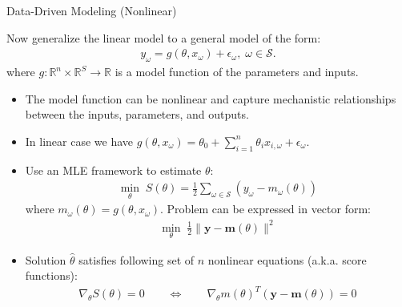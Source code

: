 \documentclass[9pt]{beamer}
\begin{document}
%
\begin{frame}{Data-Driven Modeling (Nonlinear)}

Now generalize the linear model to a general model of the form:
\begin{align*}
y_\omega=g(\theta, x_{\omega}) + \epsilon_\omega,\; \omega \in \mathcal{S}.
\end{align*}
where $g:\mathbb{R}^{n}\times \mathbb{R}^S\to \mathbb{R}$ is a model function of the parameters and inputs. 

\begin{itemize}
\item The model function can be nonlinear and capture mechanistic relationships between the inputs, parameters, and outputs. 

\item In linear case we have $g(\theta,x_\omega)=\theta_0+\sum_{i=1}^n\theta_i x_{i,\omega} + \epsilon_\omega$. 

\item Use an MLE framework to estimate $\theta$:
\begin{align*}
\min_{\theta} \; S(\theta)=\frac{1}{2}\sum_{\omega \in \mathcal{S}}(y_\omega - m_\omega(\theta))
\end{align*}
where $m_\omega(\theta)=g(\theta, x_{\omega})$.  Problem can be expressed in vector form:
\begin{align*}
\min_{\theta} \; \frac{1}{2}\|\mathbf{y} - \mathbf{m}(\theta)\|^2
\end{align*}
\item Solution $\hat{\theta}$ satisfies following set of $n$ nonlinear equations (a.k.a. score functions):
\begin{align*}
\nabla_\theta S(\theta)=0\qquad \Longleftrightarrow\qquad  \nabla_\theta m(\theta)^T(\mathbf{y}-\mathbf{m}(\theta))=0
\end{align*}
\end{itemize}
\end{frame}
\end{document}

